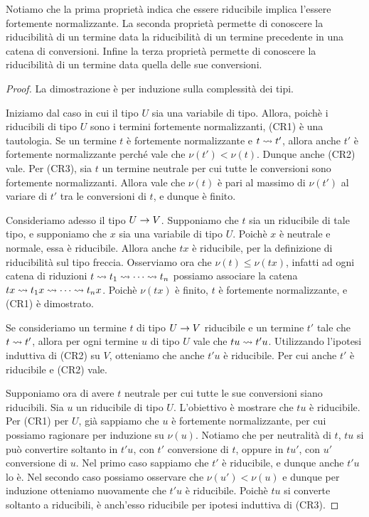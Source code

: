 \documentclass[]{marticle}
\begin{document}
Notiamo che la prima propriet\`a indica che essere riducibile implica l'essere
fortemente normalizzante. La seconda propriet\`a permette di conoscere la
riducibilit\`a di un termine data la riducibilit\`a di un termine precedente in
una catena di conversioni. Infine la terza propriet\`a permette di conoscere la
riducibilit\`a di un termine data quella delle sue conversioni.

\begin{proof}
    La dimostrazione \`e per induzione sulla complessit\`a dei tipi.

    Iniziamo dal caso in cui il tipo $U$ sia una variabile di tipo. Allora,
    poich\`e i riducibili di tipo $U$ sono i termini fortemente normalizzanti,
    (CR1) \`e una tautologia. Se un termine $t$ \`e fortemente normalizzante e
    $t\rightsquigarrow t'$, allora anche $t'$ \`e fortemente normalizzante perch\'e vale
    che $\nu(t')<\nu(t)$. Dunque anche (CR2) vale. Per (CR3), sia $t$ un termine
    neutrale per cui tutte le conversioni sono fortemente normalizzanti. Allora
    vale che $\nu(t)$ \`e pari al massimo di $\nu(t')$ al variare di $t'$ tra le
    conversioni di $t$, e dunque \`e finito.

    Consideriamo adesso il tipo $U\rightarrow V$.  Supponiamo che $t$ sia un riducibile
    di tale tipo, e supponiamo che $x$ sia una variabile di tipo $U$. Poich\`e
    $x$ \`e neutrale e normale, essa \`e riducibile. Allora anche $tx$ \`e
    riducibile, per la definizione di riducibilit\`a sul tipo freccia.
    Osserviamo ora che $\nu(t)\leq \nu(tx)$, infatti ad ogni catena di
    riduzioni $t\rightsquigarrow t_1 \rightsquigarrow\cdots \rightsquigarrow t_n$ possiamo associare la
    catena $tx \rightsquigarrow t_1 x \rightsquigarrow\cdots \rightsquigarrow t_n x$. Poich\`e $\nu(tx)$ \`e
    finito, $t$ \`e fortemente normalizzante, e (CR1) \`e dimostrato.

    Se consideriamo un termine $t$ di tipo $U\rightarrow V$ riducibile e un termine
    $t'$ tale che $t\rightsquigarrow t'$, allora per ogni termine $u$ di tipo $U$ vale che
    $tu\rightsquigarrow t'u$. Utilizzando l'ipotesi induttiva di (CR2) su $V$, otteniamo
    che anche $t'u$ \`e riducibile. Per cui anche $t'$ \`e riducibile e (CR2)
    vale.

    Supponiamo ora di avere $t$ neutrale per cui tutte le sue conversioni siano
    riducibili. Sia $u$ un riducibile di tipo $U$. L'obiettivo \`e mostrare che
    $tu$ \`e riducibile. Per (CR1) per $U$, gi\`a sappiamo che $u$ \`e
    fortemente normalizzante, per cui possiamo ragionare per induzione su
    $\nu(u)$. Notiamo che per neutralit\`a di $t$, $tu$ si pu\`o convertire
    soltanto in $t'u$, con $t'$ conversione di $t$, oppure in $tu'$, con $u'$
    conversione di $u$. Nel primo caso sappiamo che $t'$ \`e riducibile, e
    dunque anche $t'u$ lo \`e. Nel secondo caso possiamo osservare che $\nu(u')
    < \nu(u)$ e dunque per induzione otteniamo nuovamente che $t'u$ \`e
    riducibile. Poich\`e $tu$ si converte soltanto a riducibili, \`e anch'esso
    riducibile per ipotesi induttiva di (CR3). 
\end{proof}
\end{document}
